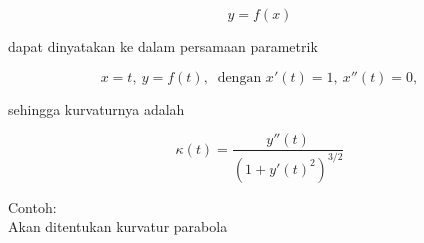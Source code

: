 \documentclass{article}
\begin{document}
\begin{eulernotebook}
\begin{eulercomment}
\begin{eulercomment}
\begin{eulercomment}
\begin{eulercomment}
\begin{eulercomment}
\begin{eulercomment}
\begin{eulercomment}
\begin{eulercomment}
\begin{eulercomment}
\begin{eulercomment}
\begin{eulercomment}
\begin{eulercomment}
\begin{eulercomment}
\begin{eulercomment}
\begin{eulercomment}
\begin{eulercomment}
\begin{eulercomment}
\begin{eulercomment}
\begin{eulercomment}
\begin{eulercomment}
\begin{eulercomment}
\begin{eulercomment}
\begin{eulercomment}
\end{eulercomment}
\begin{eulerformula}
\[
y=f(x)
\]
\end{eulerformula}
\begin{eulercomment}
dapat dinyatakan ke dalam persamaan parametrik

\end{eulercomment}
\begin{eulerformula}
\[
x=t,\ y=f(t),\ \text{ dengan } x'(t)=1,\ x''(t)=0,
\]
\end{eulerformula}
\begin{eulercomment}
sehingga kurvaturnya adalah

\end{eulercomment}
\begin{eulerformula}
\[
\kappa(t) = \frac{y''(t)}{\left(1+y'(t)^2\right)^{3/2}}
\]
\end{eulerformula}
\begin{eulercomment}
Contoh:\\
Akan ditentukan kurvatur parabola


\end{eulercomment}
\end{eulercomment}
\end{eulercomment}
\end{eulercomment}
\end{eulercomment}
\end{eulercomment}
\end{eulercomment}
\end{eulercomment}
\end{eulercomment}
\end{eulercomment}
\end{eulercomment}
\end{eulercomment}
\end{eulercomment}
\end{eulercomment}
\end{eulercomment}
\end{eulercomment}
\end{eulercomment}
\end{eulercomment}
\end{eulercomment}
\end{eulercomment}
\end{eulercomment}
\end{eulercomment}
\end{eulercomment}
\end{eulernotebook}
\end{document}

